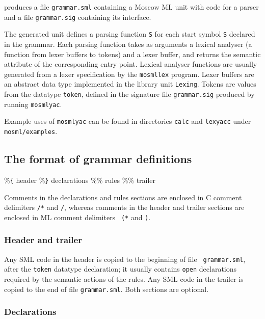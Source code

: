 \documentclass[fleqn,a4paper]{article}
\begin{document}
\noindent produces a file {\tt grammar.sml} containing a Moscow ML
unit with code for a parser and a file {\tt grammar.sig} containing
its interface.

The generated unit defines a parsing function {\tt S} for each start
symbol {\tt S} declared in the grammar.  Each parsing function takes
as arguments a lexical analyser (a function from lexer buffers to
tokens) and a lexer buffer, and returns the semantic attribute of the
corresponding entry point.  Lexical analyser functions are usually
generated from a lexer specification by the {\tt mosmllex} program.
Lexer buffers are an abstract data type implemented in the library
unit {\tt Lexing}.  Tokens are values from the datatype {\tt token},
defined in the signature file {\tt grammar.sig} produced by running
{\tt mosmlyac}.

Example uses of {\tt mosmlyac} can be found in directories {\tt calc}
and {\tt lexyacc} under {\tt mosml/examples}.


\subsection{The format of grammar definitions}

\begin{program}
\%\verb#{#
  {\rm header}
\%\verb#}#
  {\rm declarations}
\%\%
  {\rm rules}
\%\%
  {\rm trailer}
\end{program}

\noindent Comments in the declarations and rules sections are enclosed
in C comment delimiters {\tt /*} and {\tt */}, whereas comments in the
header and trailer sections are enclosed in ML comment delimiters {\tt
  (*} and {\tt *)}.


\subsubsection{Header and trailer}

Any SML code in the header is copied to the beginning of file {\tt
  grammar.sml}, after the {\tt token} datatype declaration; it usually
contains {\tt open} declarations required by the semantic actions of
the rules.  Any SML code in the trailer is copied to the end of file
{\tt grammar.sml}.  Both sections are optional.


\subsubsection{Declarations}
\end{document}
